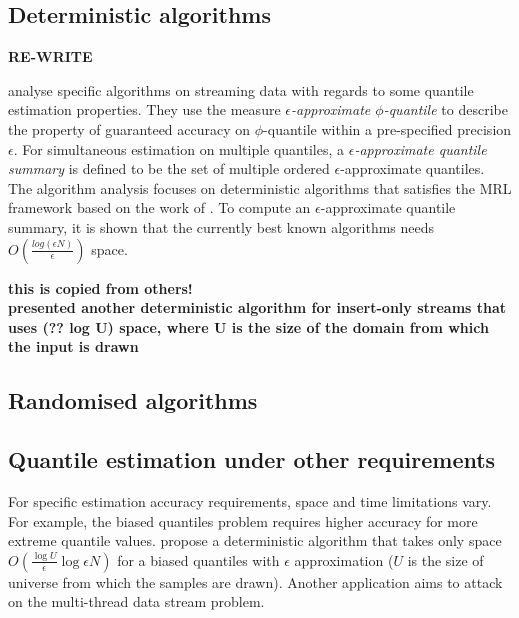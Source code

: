 \documentclass[12pt]{article}
\begin{document}
    \subsection{Deterministic algorithms}
    \label{deterministic}
    \textbf{RE-WRITE } 

    \citeauthor{greenwaldQuantilesEquidepthHistograms2016a}\cite{greenwaldQuantilesEquidepthHistograms2016a} analyse specific algorithms on streaming data with regards to some quantile estimation properties. 
    They use the measure \textit{$\epsilon$-approximate $\phi$-quantile} to describe the property of guaranteed accuracy on $\phi$-quantile within a pre-specified precision $\epsilon$. 
    For simultaneous estimation on multiple quantiles, a \textit{$\epsilon$-approximate quantile summary} is defined to be the set of multiple ordered $\epsilon$-approximate quantiles.
    The algorithm analysis focuses on deterministic algorithms that satisfies the MRL framework based on the work of \citeauthor{mankuApproximateMediansOthera} \cite{mankuApproximateMediansOthera}. To compute an $\epsilon$-approximate quantile summary, it is shown that the currently best known algorithms needs $O(\frac{log(\epsilon N)} {\epsilon})$ space.

    \textbf{ this is copied from others!\\
        \citeauthor{shrivastavaMediansNewAggregation2004} \cite{shrivastavaMediansNewAggregation2004}
         presented another deterministic algorithm for insert-only streams that uses (?? log U) space, where U is the size of the domain from which the input is drawn
        }


    \subsection{Randomised algorithms}
    \label{randomised}
    \cite{guhaStreamOrderOrder2009}


    \subsection{Quantile estimation under other requirements}
    \label{other}
    For specific estimation accuracy requirements, space and time limitations vary. For example, the biased quantiles problem requires higher accuracy for more extreme quantile values. \citeauthor{cormodeSpaceTimeefficientDeterministic2006} \cite{cormodeSpaceTimeefficientDeterministic2006} propose a deterministic algorithm that takes only space $O(\frac{\log {U}}{\epsilon} \log {\epsilon N})$ for a biased quantiles with $\epsilon$ approximation ($U$ is the size of universe from which the samples are drawn). 
    Another application aims to attack on the multi-thread data stream problem. \cite{ben-haimStreamingParallelDecision} 
\end{document}
